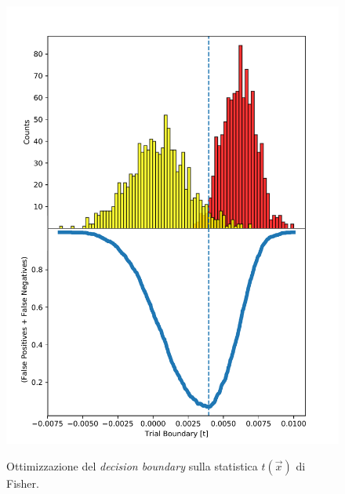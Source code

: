 \begin{figure}
	\centering
	\caption{Ottimizzazione del \emph{decision boundary} sulla statistica $t(\vec{x})$ di Fisher.}
	\includegraphics[width=\textwidth, trim={0 0 0 1cm}, clip]{Immagini/Es7Fig3.pdf}
	\label{Es7Fig3}
\end{figure}

